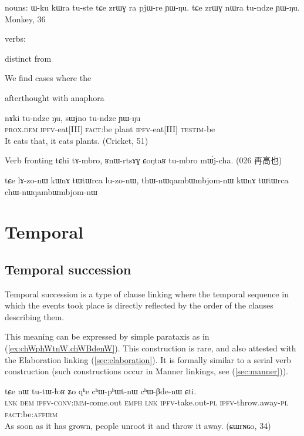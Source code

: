 \documentclass[oldfontcommands,oneside,a4paper,11pt]{article}
\newcommand{\ipa}[1]{{\phon \mbox{#1}}} %
\newcommand{\refb}[1]{(\ref{#1})}
\begin{document}
nouns:
ɯ-ku kɯra tu-ste tɕe zrɯɣ ra pjɯ-re ɲɯ-ŋu.
tɕe zrɯɣ nɯra tu-ndze ɲɯ-ŋu.
Monkey, 36
 
 

verbs:


distinct from

We find cases where the 

afterthought with anaphora 

\begin{exe}
\ex \label{ex:cataphora.tundze}
\gll
\ipa{nɤki} 	\ipa{tu-ndze} 	\ipa{ŋu,} 	\ipa{sɯjno} 	\ipa{tu-ndze} 	\ipa{ɲɯ-ŋu} \\
\textsc{prox.dem} \textsc{ipfv}-eat[III] \textsc{fact}:be plant \textsc{ipfv}-eat[III] \textsc{testim}-be \\
\glt It eats that, it eats plants. (Cricket, 51)
\end{exe}
Verb fronting
tɕhi tɤ-mbro, ʁnɯ-rtsɤɣ ɕoŋtaʁ tu-mbro mɯ́j-cha. (026 再高也)



tɕe lɤ-zo-nɯ kɯnɤ tɯtɯrca lu-zo-nɯ, thɯ-nɯqambɯmbjom-nɯ kɯnɤ tɯtɯrca chɯ-nɯqambɯmbjom-nɯ


\citet{paris81syntaxe}

\section{Temporal}
\subsection{Temporal succession}  \label{sec:temporal.succession}



Temporal succession is a type of clause linking where the temporal sequence in which the events  took place is directly reflected by the order of the clauses describing them.   

This meaning can be expressed by simple parataxis as in \refb{ex:chWphWtnW.chWBdenW}. This construction is rare, and also attested with the Elaboration linking \refb{sec:elaboration}. It is formally similar to a serial verb construction (such constructions occur in Manner linkings, see \refb{sec:manner}).
\begin{exe}
\ex \label{ex:chWphWtnW.chWBdenW}
\gll 
\ipa{tɕe}  	\ipa{nɯ}  	\ipa{tu-tɯ-ɬoʁ}  	\ipa{ʑo}  	\ipa{qʰe}  	\ipa{cʰɯ-pʰɯt-nɯ}  	\ipa{cʰɯ-βde-nɯ}  	\ipa{ɕti.}  \\
\textsc{lnk} \textsc{dem} \textsc{ipfv-conv:imm}-come.out \textsc{emph} \textsc{lnk} \textsc{ipfv}-take.out-\textsc{pl} \textsc{ipfv}-throw.away-\textsc{pl}  \textsc{fact}:be:\textsc{affirm} \\
\glt As soon as it has grown, people unroot it and throw it away. (ɕɯrɴɢo, 34)
\end{exe}
\end{document}
